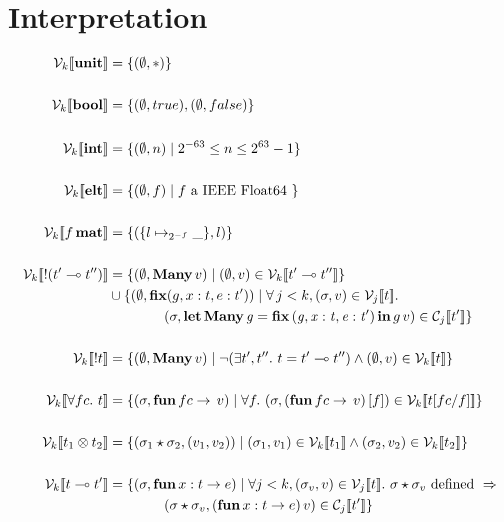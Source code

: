 \section{Interpretation}

\begin{align*}
  \V{k}{ \Unit } &= \{ (\empH, \ast) \} \\
\\
    \V{k}{ \Bool } &= \{ (\empH, true), (\empH, false) \} \\
\\
    \V{k}{ \Int } &= \{ (\empH, n) \mid 2^{-63} \leq n \leq 2^{63} -1 \} \\
\\
    \V{k}{ \Elt } &= \{ (\empH, f) \mid f \textrm{ a IEEE Float64 } \} \\
\\
    \V{k}{ f \, \Mat } &= \{ (\{ l \mapsto_{2^{-f}} \_ \} , l) \} \\
\\
    \V{k}{ \Bang (t' \multimap t'') } &= \{ (\empH, \Many\, v) \mid (\empH, v) \in \V{k}{ t' \multimap t'' } \} \\
                                      & \cup \{ (\empH, \ottkw{fix} (g, x : t, e : t')) \mid \forall \, j < k, (\sigma, v) \in \V{j}{ t }.\\
                                      & \qquad \qquad (\sigma, \letManyG g\, v) \in \C{j}{ t' } \} \\
\\
    \V{k}{ \Bang t } &= \{ (\empH, \Many\, v) \mid \neg (\exists t', t''.\ t = t' \multimap t'') \wedge (\empH, v) \in \V{k}{t} \} \\
\\
    \V{k}{ \forall fc.\  t } &= \{ (\sigma, \ottkw{fun}\, fc \rightarrow \, v) \mid \forall f.\ (\sigma, (\ottkw{fun}\, fc \rightarrow \, v)\, [ f ]) \in \V{k}{ t [ fc / f ] } \} \\
\\
    \V{k}{ t_1 \otimes t_2 } &= \{ (\sigma_1 \star \sigma_2, ( v_1, v_2 )) \mid (\sigma_1, v_1) \in \V{k}{t_1} \wedge (\sigma_2, v_2) \in \V{k}{t_2} \} \\
\\
    \V{k}{ t \multimap t' } &= \{ (\sigma, \ottkw{fun}\, x : t \rightarrow e) \mid \forall j < k, (\sigma_v, v) \in \V{j}{ t }.\ \sigma \star \sigma_v \textrm{ defined } \Rightarrow \\
                            & \qquad \qquad (\sigma \star \sigma_v, (\ottkw{fun}\, x : t \rightarrow e)\, v) \in \C{j}{ t' } \} \\

\end{align*}
